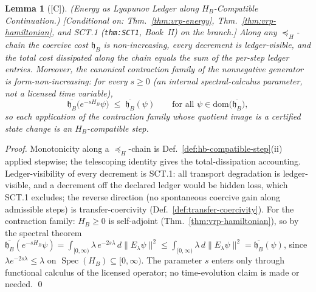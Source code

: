 \documentclass[12pt,oneside]{amsbook}
\theoremstyle{plain}
\newtheorem{lemma}[theorem]{Lemma}
\theoremstyle{definition}
\theoremstyle{remark}
\newcommand{\status}[1]{\textup{[#1]}}
\begin{document}
\begin{lemma}[\status{C}]\label{lem:vrp-ham-lyapunov}
\textup{(Energy as Lyapunov Ledger along $H_B$-Compatible
Continuation.)}
\textup{[Conditional on: Thm.~\ref{thm:vrp-energy},
Thm.~\ref{thm:vrp-hamiltonian}, and SCT.1
(\texttt{thm:SCT1}, Book~II) on the branch.]}
Along any $\preceq_H$-chain the coercive cost $\mathfrak{h}_B$ is
non-increasing, every decrement is ledger-visible, and the total
cost dissipated along the chain equals the sum of the per-step
ledger entries.  Moreover, the canonical contraction family of the
nonnegative generator is form-non-increasing: for every $s \ge 0$
(an internal spectral-calculus parameter, \emph{not} a licensed
time variable),
\[
  \overline{\mathfrak{h}_B}\bigl(e^{-sH_B}\psi\bigr)
  \;\le\;
  \overline{\mathfrak{h}_B}(\psi)
  \qquad
  \text{for all } \psi \in
  \mathrm{dom}\bigl(\overline{\mathfrak{h}_B}\bigr),
\]
so each application of the contraction family whose quotient image
is a certified state change is an $H_B$-compatible step.
\end{lemma}

\begin{proof}
Monotonicity along a $\preceq_H$-chain is
Def.~\ref{def:hb-compatible-step}(ii) applied stepwise; the
telescoping identity gives the total-dissipation accounting.
Ledger-visibility of every decrement is SCT.1: all transport
degradation is ledger-visible, and a decrement off the declared
ledger would be hidden loss, which SCT.1 excludes; the reverse
direction (no spontaneous coercive gain along admissible steps) is
transfer-coercivity (Def.~\ref{def:transfer-coercivity}).  For the
contraction family: $H_B \ge 0$ is self-adjoint
(Thm.~\ref{thm:vrp-hamiltonian}), so by the spectral theorem
$\overline{\mathfrak{h}_B}(e^{-sH_B}\psi) = \int_{[0,\infty)}
\lambda\, e^{-2s\lambda}\, d\|E_\lambda \psi\|^2 \le
\int_{[0,\infty)} \lambda\, d\|E_\lambda \psi\|^2 =
\overline{\mathfrak{h}_B}(\psi)$, since
$\lambda e^{-2s\lambda} \le \lambda$ on
$\operatorname{Spec}(H_B) \subseteq [0,\infty)$.  The parameter
$s$ enters only through functional calculus of the licensed
operator; no time-evolution claim is made or needed. \qed
\end{proof}
\end{document}
